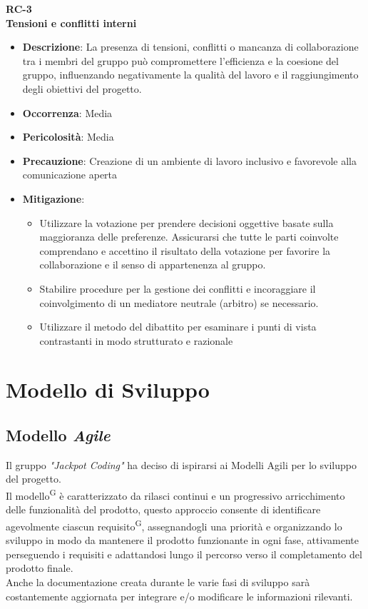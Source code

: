 \documentclass[5pt]{article}
\begin{document}
      \textbf{RC-3}\\
      \textbf{Tensioni e conflitti interni}
      \begin{itemize}
        \item \textbf{Descrizione}: La presenza di tensioni, conflitti o mancanza di collaborazione tra i membri del gruppo può compromettere l'efficienza e la coesione del gruppo, influenzando negativamente la qualità del lavoro e il raggiungimento degli obiettivi del progetto.
        \item \textbf{Occorrenza}: Media
        \item \textbf{Pericolosità}: Media
        \item \textbf{Precauzione}: Creazione di un ambiente di lavoro inclusivo e favorevole alla comunicazione aperta
        \item \textbf{Mitigazione}: 
          \begin{itemize}
            \item Utilizzare la votazione per prendere decisioni oggettive basate sulla maggioranza delle preferenze. Assicurarsi che tutte le parti coinvolte comprendano e accettino il risultato della votazione per favorire la collaborazione e il senso di appartenenza al gruppo.
            \item Stabilire procedure per la gestione dei conflitti e incoraggiare il coinvolgimento di un mediatore neutrale (arbitro) se necessario.
            \item Utilizzare il metodo del dibattito per esaminare i punti di vista contrastanti in modo strutturato e razionale
          \end{itemize}
      \end{itemize}

\section{Modello di Sviluppo}
  \subsection{Modello \textit{Agile}}
    Il gruppo \textit{"Jackpot Coding"} ha deciso di ispirarsi ai Modelli Agili per lo sviluppo del progetto.\\
    Il modello\textsuperscript{G} è caratterizzato da rilasci continui e un progressivo arricchimento delle funzionalità del prodotto, questo approccio consente di identificare agevolmente ciascun requisito\textsuperscript{G}, assegnandogli una priorità e organizzando lo sviluppo in modo da mantenere il prodotto funzionante in ogni fase, attivamente perseguendo i requisiti e adattandosi lungo il percorso verso il completamento del prodotto finale.\\
    Anche la documentazione creata durante le varie fasi di sviluppo sarà costantemente aggiornata per integrare e/o modificare le informazioni rilevanti.
\end{document}
